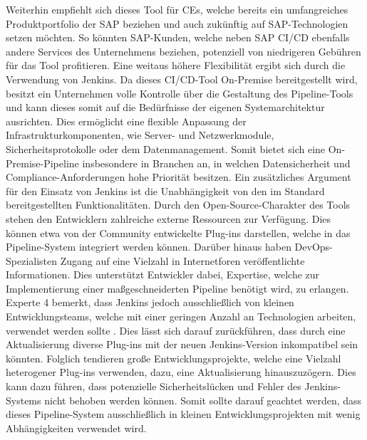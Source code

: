 	Weiterhin empfiehlt sich dieses Tool für CEs, welche bereits ein umfangreiches Produktportfolio der SAP beziehen und auch zukünftig auf SAP-Technologien setzen möchten. So könnten SAP-Kunden, welche neben SAP CI/CD ebenfalls andere Services des Unternehmens beziehen, potenziell von niedrigeren Gebühren für das Tool profitieren. Eine weitaus höhere Flexibilität ergibt sich durch die Verwendung von Jenkins. Da dieses CI/CD-Tool On-Premise bereitgestellt wird, besitzt ein Unternehmen volle Kontrolle über die Gestaltung des Pipeline-Tools und kann dieses somit auf die Bedürfnisse der eigenen Systemarchitektur ausrichten. Dies ermöglicht eine flexible Anpassung der Infrastrukturkomponenten, wie Server- und Netzwerkmodule, Sicherheitsprotokolle oder dem Datenmanagement. Somit bietet sich eine On-Premise-Pipeline insbesondere in Branchen an, in welchen Datensicherheit und Compliance-Anforderungen hohe Priorität besitzen. Ein zusätzliches Argument für den Einsatz von Jenkins ist die Unabhängigkeit von den im Standard bereitgestellten Funktionalitäten. Durch den Open-Source-Charakter des Tools stehen den Entwicklern zahlreiche externe Ressourcen zur Verfügung. Dies können etwa von der Community entwickelte Plug-ins darstellen, welche in das Pipeline-System integriert werden können. Darüber hinaus haben DevOps-Spezialisten Zugang auf eine Vielzahl in Internetforen veröffentlichte Informationen. Dies unterstützt Entwickler dabei, Expertise, welche zur Implementierung einer maßgeschneiderten Pipeline benötigt wird, zu erlangen. Experte 4 bemerkt, dass Jenkins jedoch ausschließlich von kleinen Entwicklungsteams, welche mit einer geringen Anzahl an Technologien arbeiten, verwendet werden sollte \cite[Z. 58 ff.]{TestDeveloperSAPHyperspaceAdoption&Onboarding.}. Dies lässt sich darauf zurückführen, dass durch eine Aktualisierung diverse Plug-ins mit der neuen Jenkins-Version inkompatibel sein könnten. Folglich tendieren große Entwicklungsprojekte, welche eine Vielzahl heterogener Plug-ins verwenden, dazu, eine Aktualisierung hinauszuzögern. Dies kann dazu führen, dass potenzielle Sicherheitslücken und Fehler des Jenkins-Systems nicht behoben werden können. Somit sollte darauf geachtet werden, dass dieses Pipeline-System ausschließlich in kleinen Entwicklungsprojekten mit wenig Abhängigkeiten verwendet wird.  
